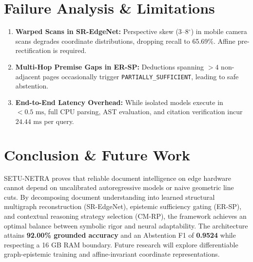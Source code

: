 \documentclass[conference]{IEEEtran}
\begin{document}
\section{Failure Analysis \& Limitations}
\begin{enumerate}
    \item \textbf{Warped Scans in SR-EdgeNet:} Perspective skew (3--8$^\circ$) in mobile camera scans degrades coordinate distributions, dropping recall to 65.69\%. Affine pre-rectification is required.
    \item \textbf{Multi-Hop Premise Gaps in ER-SP:} Deductions spanning $>4$ non-adjacent pages occasionally trigger \texttt{PARTIALLY\_SUFFICIENT}, leading to safe abstention.
    \item \textbf{End-to-End Latency Overhead:} While isolated models execute in $<0.5\text{ ms}$, full CPU parsing, AST evaluation, and citation verification incur $24.44\text{ ms}$ per query.
\end{enumerate}

\section{Conclusion \& Future Work}
SETU-NETRA proves that reliable document intelligence on edge hardware cannot depend on uncalibrated autoregressive models or naive geometric line cuts. By decomposing document understanding into learned structural multigraph reconstruction (SR-EdgeNet), epistemic sufficiency gating (ER-SP), and contextual reasoning strategy selection (CM-RP), the framework achieves an optimal balance between symbolic rigor and neural adaptability. The architecture attains \textbf{92.00\% grounded accuracy} and an Abstention F1 of \textbf{0.9524} while respecting a 16 GB RAM boundary. Future research will explore differentiable graph-epistemic training and affine-invariant coordinate representations.
\end{document}
